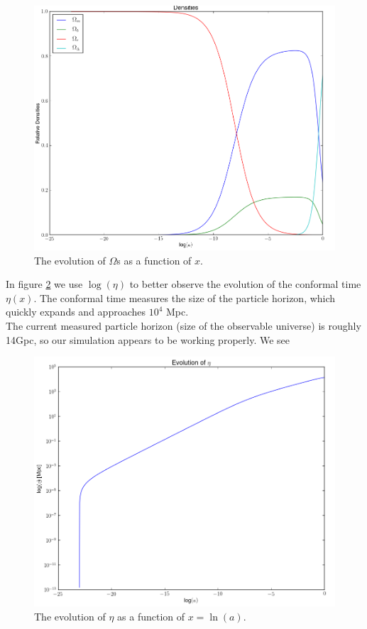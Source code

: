 \documentclass[a4paper]{article}
\begin{document}
\begin{figure}[h!]\label{fig:dens}
\centering
\includegraphics[scale=0.25]{densities2}
\caption{The evolution of $\Omega$s as a function of $x$.}
\end{figure} 
In figure \ref{fig:etax} we use $\log(\eta)$ to better observe the evolution of the conformal time $\eta(x)$. The conformal time measures the size of the particle horizon, which quickly expands and approaches $10^4$ Mpc.\\

The current measured particle horizon (size of the observable universe) is roughly 14Gpc, so our simulation appears to be working properly. We see 



\begin{figure}[hb!]\label{fig:etax}
\centering
\includegraphics[scale=0.25]{eta_x2}
\caption{The evolution of $\eta$ as a function of $x = \ln(a)$.}
\end{figure}
\end{document}
